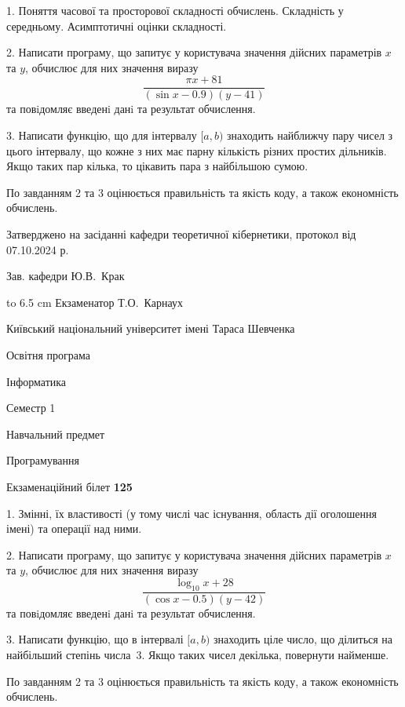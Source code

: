 \documentclass[12pt, ukrainian]{article}
\begin{document}
{%
1. Поняття часової та просторової складності обчислень. Складність у середньому. Асимптотичні оцінки складності.%
\par
2. Написати програму, що запитує у користувача значення дійсних параметрів $x$ та $y$, обчислює для них значення виразу 
$$\frac{\pi x + 81}{(\sin x - 0.9) (y - 41)}$$ 
та повiдомляє введенi данi та результат обчислення.

\par
3. Написати функцію, що для інтервалу $[a, b)$ знаходить найближчу пару чисел з цього інтервалу, що кожне з них має парну кількість різних простих дільників. Якщо таких пар кілька, то цікавить пара з найбільшою сумою.

По завданням 2 та 3 оцінюється правильність та якість коду, а також економність обчислень.

}
{\smallskip\smallskip \begin {scriptsize} Затверджено на засіданні кафедри теоретичної кібернетики, протокол   від   07.10.2024 р.\par\smallskip\smallskip\smallskip\smallskip
{\parbox {6.5 cm} {Зав. кафедри \dotfill Ю.В.~Крак}}\hspace {0.7cm} {\hbox to 6.5 cm { Екзаменатор \dotfill Т.О.~Карнаух}} \end{scriptsize}}
\vspace{0.9cm}
{{\begin {scriptsize}\par
{ \center  Київський національний університет імені Тараса Шевченка \par}
{\parbox {5 cm}{Освітня програма \hfill}{\parbox {7 cm}{Інформатика\hfill}}\parbox {6 cm}{\hfill Семестр 1}}\par
{\parbox {5 cm} {Навчальний предмет \hfill}\parbox {7 cm}{Програмування \hfill}\parbox {6cm}{\hfill}\par}\vspace{-15pt} \end{scriptsize}}{\center Екзаменаційний білет \No \textbf { 125 }\par}}
{%
1. Змінні, їх властивості (у тому числі час існування, область дії оголошення імені) та операції над ними.%
\par
2. Написати програму, що запитує у користувача значення дійсних параметрів $x$ та $y$, обчислює для них значення виразу 
$$\frac{\log_{10} x + 28}{(\cos x - 0.5) (y - 42)}$$ 
та повiдомляє введенi данi та результат обчислення.

\par
3. Написати функцію, що в інтервалі $[a, b)$ знаходить ціле число, що ділиться на найбільший степінь числа 3. Якщо таких чисел декілька, повернути найменше.

По завданням 2 та 3 оцінюється правильність та якість коду, а також економність обчислень.

}
\end{document}
